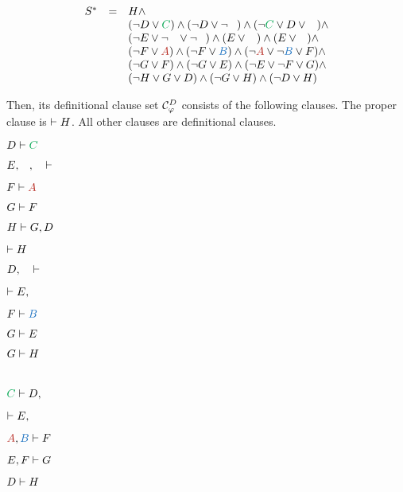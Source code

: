 \begin{example}
$$
\begin{array}{rcl}
S^*	
& \defEq & H \structplus \\
&			& 
(\structdual D \structtimes \hE{C})
\structplus
(\structdual D \structtimes \structdual \hF{C})
\structplus
( \structdual \hE{C} \structtimes D \structtimes \hF{C}) \structplus \\
&			&
(\structdual E \structtimes \structdual \hC{B} \structtimes \structdual \hD{A} )
\structplus
(E \structtimes \hC{B})
\structplus
(E \structtimes \hD{A}) \structplus \\
&			&
(\structdual F \structtimes \hA{A})
\structplus
(\structdual F \structtimes \hB{B})
\structplus
(\structdual \hA{A} \structtimes \structdual \hB{B} \structtimes F) \structplus \\
&			&
(\structdual G \structtimes F)
\structplus
(\structdual G \structtimes E)
\structplus
(\structdual E \structtimes \structdual F \structtimes G) \structplus \\
&			&
(\structdual H \structtimes G \structtimes D)
\structplus
(\structdual G \structtimes H)
\structplus
(\structdual D \structtimes H) \\
\end{array}
$$

Then, its definitional clause set $\mathcal{C}^{D}_{\varphi}$ consists of the following clauses. The proper clause is $\vdash H$. All other clauses are definitional clauses.

\begin{multicols}{3}{
{
$D \seq \hE{C}$

$E, \hC{B}, \hD{A} \seq $

$F \seq \hA{A}$

$G \vdash F$

$H \vdash G, D$

$\vdash H$
}

{
$D, \hF{C} \seq $

$\seq E, \hC{B}$

$F \seq \hB{B}$

$G \vdash E$

$G \vdash H$

$\phantom{\seq H}$
}

{
$ \hE{C} \seq D, \hF{C}$

$\seq E, \hD{A}$

$\hA{A}, \hB{B} \seq F$

$E, F \vdash G$

$D \vdash H$

$\phantom{\seq H}$
}
}\end{multicols}

\end{example}

